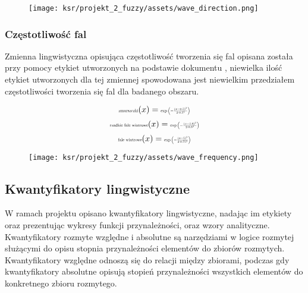 \documentclass{article}
\begin{document}
\begin{figure}[H]
\centering
\texttt{[image: ksr/projekt\_2\_fuzzy/assets/wave\_direction.png]}
\label{fig:epsilon_bat}
\end{figure}

\subsubsection{Częstotliwość fal}

\noindent Zmienna lingwistyczna opisująca częstotliwość tworzenia się fal opisana została przy pomocy etykiet utworzonych na podstawie dokumentu \cite{waves}, niewielka ilość etykiet utworzonych dla tej zmiennej spowodowana jest niewielkim przedziałem częstotliwości tworzenia się fal dla badanego obszaru.

\begin{equation*}
\text{\scalebox{0.5}{zmarszczki}}(x) = \scalebox{0.5}{$\exp\left(-\frac{{(x - 0.5)^2}}{{2 \cdot 0.5^2}}\right)$}
\end{equation*}
\begin{equation*}
\text{\scalebox{0.5}{rzadkie fale wiatrowe}}(x) = \scalebox{0.5}{$\exp\left(-\frac{{(x - 2.6)^2}}{{2 \cdot 0.6^2}}\right)$}
\end{equation*}
\begin{equation*}
\text{\scalebox{0.5}{fale wiatrowe}}(x) = \scalebox{0.5}{$\exp\left(-\frac{{(x - 5)^2}}{{2 \cdot 0.75^2}}\right)$}
\end{equation*}

\begin{figure}[H]
\centering
\texttt{[image: ksr/projekt\_2\_fuzzy/assets/wave\_frequency.png]}
\label{fig:epsilon_bat}
\end{figure}

\subsection{Kwantyfikatory lingwistyczne}

\noindent W ramach projektu opisano kwantyfikatory lingwistyczne, nadając im etykiety oraz prezentując wykresy funkcji przynależności, oraz wzory analityczne. Kwantyfikatory rozmyte względne i absolutne są narzędziami w logice rozmytej służącymi do opisu stopnia przynależności elementów do zbiorów rozmytych. Kwantyfikatory względne odnoszą się do relacji między zbiorami, podczas gdy kwantyfikatory absolutne opisują stopień przynależności wszystkich elementów do konkretnego zbioru rozmytego.\\
\end{document}
